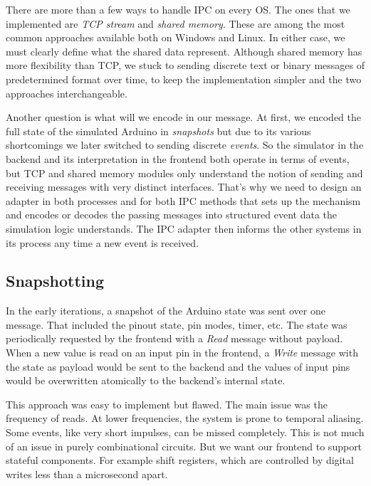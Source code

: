 There are more than a few ways to handle IPC on every OS. The ones that we implemented are \textit{TCP stream} and \textit{shared memory}. These are among the most common approaches available both on Windows and Linux. In either case, we must clearly define what the shared data represent. Although shared memory has more flexibility than TCP, we stuck to sending discrete text or binary messages of predetermined format over time, to keep the implementation simpler and the two approaches interchangeable.

Another question is what will we encode in our message. At first, we encoded the full state of the simulated Arduino in \textit{snapshots} but due to its various shortcomings we later switched to sending discrete \textit{events}. So the simulator in the backend and its interpretation in the frontend both operate in terms of events, but TCP and shared memory modules only understand the notion of sending and receiving messages with very distinct interfaces. That's why we need to design an adapter in both processes and for both IPC methods that sets up the mechanism and encodes or decodes the passing messages into structured event data the simulation logic understands. The IPC adapter then informs the other systems in its process any time a new event is received.

\subsection{Snapshotting}

In the early iterations, a snapshot of the Arduino state was sent over one message. That included the pinout state, pin modes, timer, etc. The state was periodically requested by the frontend with a \textit{Read} message without payload. When a new value is read on an input pin in the frontend, a \textit{Write} message with the state as payload would be sent to the backend and the values of input pins would be overwritten atomically to the backend's internal state. 

This approach was easy to implement but flawed. The main issue was the frequency of reads. At lower frequencies, the system is prone to temporal aliasing. \footnotemark Some events, like very short impulses, can be missed completely. This is not much of an issue in purely combinational circuits. But we want our frontend to support stateful components. For example shift registers, which are controlled by digital writes less than a microsecond apart. \footnotemark

